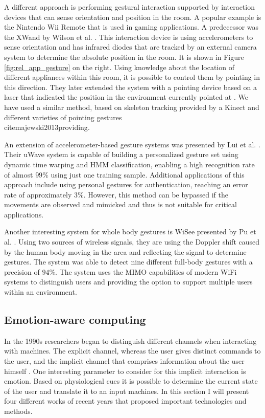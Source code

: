 A different approach is performing gestural interaction supported by interaction devices that can sense orientation and position in the room. A popular example is the Nintendo Wii Remote that is used in gaming applications. A predecessor was the XWand by Wilson et al. \cite{Wilson2003}. This interaction device is using accelerometers to sense orientation and has infrared diodes that are tracked by an external camera system to determine the absolute position in the room. It is shown in Figure \ref{fig:rel_app_gesture} on the right. Using knowledge about the location of different appliances within this room, it is possible to control them by pointing in this direction. They later extended the system with a pointing device based on a laser that indicated the position in the environment currently pointed at \cite{Wilson2003a}. We have used a similar method, based on skeleton tracking provided by a Kinect and different varieties of pointing gestures \\cite{majewski2013providing}.

An extension of accelerometer-based gesture systems was presented by Lui et al. \cite{liu2009uwave}. Their uWave system is capable of building a personalized gesture set using dynamic time warping and HMM classification, enabling a high recognition rate of almost $99\%$ using just one training sample. Additional applications of this approach include using personal gestures for authentication, reaching an error rate of approximately $3\%$. However, this method can be bypassed if the movements are observed and mimicked and thus is not suitable for critical applications.

Another interesting system for whole body gestures is WiSee presented by Pu et al. \cite{pu2013whole}. Using two sources of wireless signals, they are using the Doppler shift caused by the human body moving in the area and reflecting the signal to determine gestures. The system was able to detect nine different full-body gestures with a precision of $94\%$. The system uses the MIMO capabilities of modern WiFi systems to distinguish users and providing the option to support multiple users within an environment.

\subsection{Emotion-aware computing}
In the 1990s researchers began to distinguish different channels when interacting with machines. The explicit channel, whereas the user gives distinct commands to the user, and the implicit channel that comprises information about the user himself \cite{cowie2001emotion}. One interesting parameter to consider for this implicit interaction is emotion. Based on physiological cues it is possible to determine the current state of the user and translate it to an input machines. In this section I will present four different works of recent years that proposed important technologies and methods.

